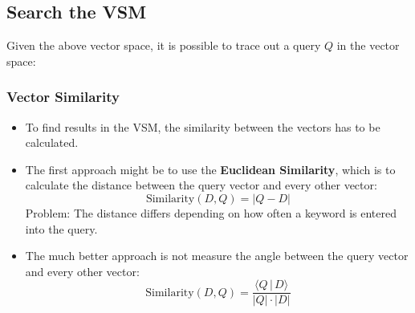 \documentclass[a4paper, 11pt, accentcolor = tud3b]{tudreport}
\providecommand{\abs}[1]{\ensuremath{{\lvert #1 \rvert}}}
\begin{document}
            \subsection{Search the VSM} %
           		Given the above vector space, it is possible to trace out a query \(Q\) in the vector space:
           		\begin{figure}[H]
           			\centering
           		\end{figure}
           	
           		\subsubsection{Vector Similarity} %
           			\begin{itemize}
           				\item To find results in the VSM, the similarity between the vectors has to be calculated.
           				\item The first approach might be to use the \textbf{Euclidean Similarity}, which is to calculate the distance between the query vector and every other vector:
           					\begin{equation*}
	           					\text{Similarity}(D, Q) = \abs{Q - D}
           					\end{equation*}
           					Problem: The distance differs depending on how often a keyword is entered into the query.
           				\item The much better approach is not measure the angle between the query vector and every other vector:
           					\begin{equation*}
	           					\text{Similarity}(D, Q) = \frac{\langle Q \,\vert\, D \rangle}{\abs{Q} \cdot \abs{D}}
           					\end{equation*}
           			\end{itemize}
\end{document}
